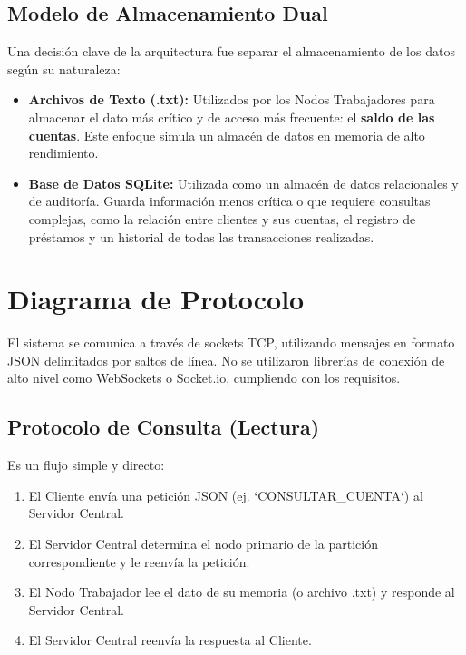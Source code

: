 \documentclass[11pt, a4paper]{article}
\begin{document}
\subsection{Modelo de Almacenamiento Dual}
Una decisi\'{o}n clave de la arquitectura fue separar el almacenamiento de los datos seg\'{u}n su naturaleza:
\begin{itemize}
    \item \textbf{Archivos de Texto (.txt):} Utilizados por los Nodos Trabajadores para almacenar el dato m\'{a}s cr\'{i}tico y de acceso m\'{a}s frecuente: el \textbf{saldo de las cuentas}. Este enfoque simula un almac\'{e}n de datos en memoria de alto rendimiento. 
    
    \item \textbf{Base de Datos SQLite:} Utilizada como un almac\'{e}n de datos relacionales y de auditor\'{i}a. Guarda informaci\'{o}n menos cr\'{i}tica o que requiere consultas complejas, como la relaci\'{o}n entre clientes y sus cuentas, el registro de pr\'{e}stamos y un historial de todas las transacciones realizadas.
\end{itemize}

\section{Diagrama de Protocolo}
El sistema se comunica a trav\'{e}s de sockets TCP, utilizando mensajes en formato JSON delimitados por saltos de l\'{i}nea. No se utilizaron librer\'{i}as de conexi\'{o}n de alto nivel como WebSockets o Socket.io, cumpliendo con los requisitos.

\subsection{Protocolo de Consulta (Lectura)}
Es un flujo simple y directo:
\begin{enumerate}
    \item El Cliente env\'{i}a una petici\'{o}n JSON (ej. `CONSULTAR_CUENTA`) al Servidor Central.
    \item El Servidor Central determina el nodo primario de la partici\'{o}n correspondiente y le reenv\'{i}a la petici\'{o}n.
    \item El Nodo Trabajador lee el dato de su memoria (o archivo .txt) y responde al Servidor Central.
    \item El Servidor Central reenv\'{i}a la respuesta al Cliente.
\end{enumerate}
\end{document}
